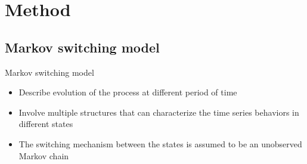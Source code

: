 \documentclass{beamer}
\begin{document}
\section{Method} 
\subsection{Markov switching model}
\begin{frame}[fragile]
Markov switching model \cite{p1}

\begin{itemize}
	\item Describe evolution of the process at different period of time
	\item Involve multiple structures that can characterize the time series behaviors in different states
	\item The switching mechanism between the states is assumed to be an unobserved Markov chain
\end{itemize}

\end{frame}
\end{document}
